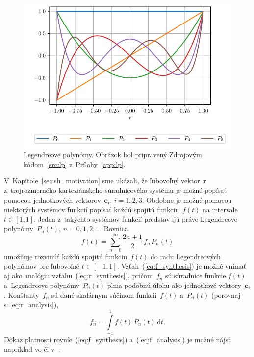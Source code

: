 \documentclass[a4paper, 12pt]{book}
\newcommand{\diff}{\mathrm d}
\let\vec\mathbf
\begin{document}
\begin{figure}[bt]
\centering
\includegraphics{./fig-legendre-polynomials.pdf}
\caption{Legendreove polynómy.  Obrázok bol pripravený Zdrojovým
kódom~\ref{src:lp} z~Prílohy~\ref{app:lp}.}
\label{fig:lp}
\end{figure}

V~Kapitole~\ref{sec:sh_motivation} sme ukázali, že ľubovoľný vektor~$\vec r$
z~trojrozmerného karteziánskeho súradnicového systému je možné popísať pomocou
jednotkových vektorov~$\vec e_i$, $i = 1, 2, 3$.  Obdobne je možné pomocou
niektorých systémov funkcií popísať každú spojitú funkciu~$f(t)$ na intervale
$t \in [1, 1]$.  Jeden z~takýchto systémov funkcií predstavujú práve
Legendreove polynómy~$P_n(t)$, $n = 0, 1, 2, \dots$  Rovnica
%
\begin{equation}
\label{eq:f_synthesis}
f(t) = \sum_{n = 0}^\infty \frac{2n + 1}{2} \, f_n \, P_n(t)
\end{equation}
%
umožňuje rozvinúť každú spojitú funkciu~$f(t)$ do radu Legendreových polynómov
pre ľubovoľné $t \in [-1, 1]$.  Vzťah~(\ref{eq:f_synthesis}) je možné vnímať aj
ako analógiu vzťahu~(\ref{eq:r_synthesis}), pričom~$f_n$ sú súradnice funkcie
$f(t)$ a~Legendreove polynómy~$P_n(t)$ plnia podobnú úlohu ako jednotkové
vektory~$\vec e_i$.  Konštanty~$f_n$ sú dané skalárnym súčinom funkcií~$f(t)$
a~$P_n(t)$ (porovnaj s~\ref{eq:r_analysis}),
%
\begin{equation}
\label{eq:f_analysis}
f_n = \int\limits_{-1}^1 f(t) \, P_n(t) \, \diff t{.}
\end{equation}
%
Dôkaz platnosti rovníc~(\ref{eq:f_synthesis}) a~(\ref{eq:f_analysis}) je možné 
nájsť napríklad vo \textcite{Freeden2009} či 
v~\textcite{SansoGeoidDetermination}.
\end{document}
